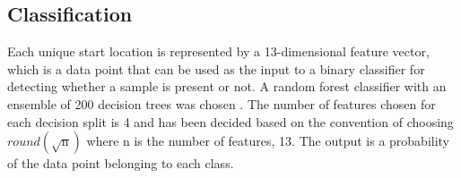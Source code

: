 \documentclass{article}
\begin{document}




\subsection{Classification}
\label{class}
Each unique start location is represented by a 13-dimensional feature vector, which is a data point that can be used as the input to a binary classifier for detecting whether a sample is present or not.
%
A random forest classifier with an ensemble of 200 decision trees was chosen \cite{breiman2001random}. The number of features chosen for each decision split is 4 and has been decided based on the convention of choosing $round(\sqrt{\mathrm{n}})$ where $\mathrm{n}$ is the number of features, 13. The output is a probability of the data point belonging to each class.
\end{document}
